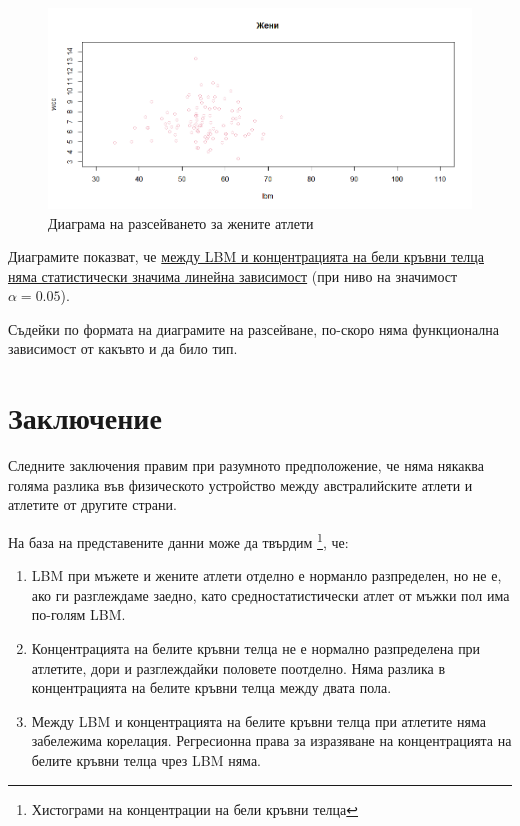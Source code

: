 \documentclass[12pt]{article} %
\begin{document}
\begin{large}
  \clearpage
  \begin{figure}[!h!]
    \includegraphics[width=\textwidth,height=\textheight,keepaspectratio]{pics/scatterwomen2}
    \caption{Диаграма на разсейването за жените атлети}
  \end{figure}

  Диаграмите показват, че \uline{между LBM и концентрацията на бели кръвни телца няма статистически значима линейна зависимост} (при ниво на значимост $\alpha=0.05$). \par
  Съдейки по формата на диаграмите на разсейване, по-скоро няма функционална зависимост от какъвто и да било тип.

  \section{Заключение}
  Следните заключения правим при  разумното предположение, че няма някаква голяма разлика във физическото устройство между австралийските атлети и атлетите от другите страни. \par
  На база на представените данни може да твърдим \footnote{Хистограми на концентрации на бели кръвни телца}, че:
  \begin{enumerate}
    \item LBM при мъжете и жените атлети отделно е норманло разпределен, но не е, ако ги разглеждаме заедно, като средностатистически атлет от мъжки пол има по-голям LBM.
    \item Концентрацията на белите кръвни телца не е нормално разпределена при атлетите, дори и разглеждайки половете поотделно. Няма разлика в концентрацията на белите кръвни телца между двата пола.
    \item Между LBM и концентрацията на белите кръвни телца при атлетите няма забележима корелация. Регресионна права за изразяване на концентрацията на белите кръвни телца чрез LBM няма.
  \end{enumerate}

  \listoffigures

  \listoftables
\end{large}
\end{document}
